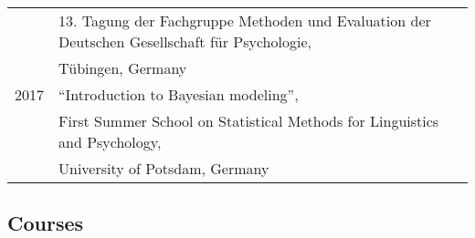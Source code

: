 \documentclass[]{article}
\begin{document}
\begin{longtable}[]{@{}ll@{}}
\begin{minipage}[t]{0.25\columnwidth}
\strut
\end{minipage} & \begin{minipage}[t]{0.69\columnwidth}\raggedright
13. Tagung der Fachgruppe Methoden und Evaluation der Deutschen
Gesellschaft für Psychologie,\strut
\end{minipage}\tabularnewline
\begin{minipage}[t]{0.25\columnwidth}\raggedright
\strut
\end{minipage} & \begin{minipage}[t]{0.69\columnwidth}\raggedright
Tübingen, Germany\vspace{.1cm}\strut
\end{minipage}\tabularnewline
\begin{minipage}[t]{0.25\columnwidth}\raggedright
2017\strut
\end{minipage} & \begin{minipage}[t]{0.69\columnwidth}\raggedright
``Introduction to Bayesian modeling'',\strut
\end{minipage}\tabularnewline
\begin{minipage}[t]{0.25\columnwidth}\raggedright
\strut
\end{minipage} & \begin{minipage}[t]{0.69\columnwidth}\raggedright
First Summer School on Statistical Methods for Linguistics and
Psychology,\strut
\end{minipage}\tabularnewline
\begin{minipage}[t]{0.25\columnwidth}\raggedright
\strut
\end{minipage} & \begin{minipage}[t]{0.69\columnwidth}\raggedright
University of Potsdam, Germany\vspace{.1cm}\strut
\end{minipage}\tabularnewline
\bottomrule
\end{longtable}

\hypertarget{courses}{%
\subsection{Courses}\label{courses}}
\end{document}

